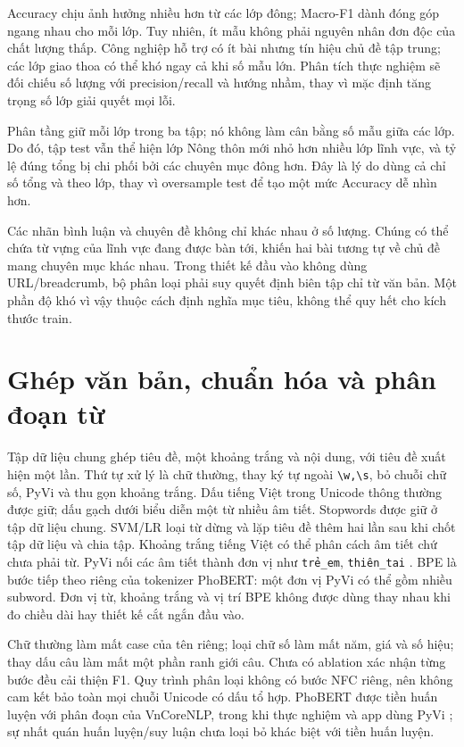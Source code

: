 Accuracy chịu ảnh hưởng nhiều hơn từ các lớp đông; Macro-F1 dành đóng góp ngang nhau cho mỗi lớp. Tuy nhiên, ít mẫu không phải nguyên nhân đơn độc của chất lượng thấp. Công nghiệp hỗ trợ có ít bài nhưng tín hiệu chủ đề tập trung; các lớp giao thoa có thể khó ngay cả khi số mẫu lớn. Phân tích thực nghiệm sẽ đối chiếu số lượng với precision/recall và hướng nhầm, thay vì mặc định tăng trọng số lớp giải quyết mọi lỗi.


Phân tầng giữ mỗi lớp trong ba tập; nó không làm cân bằng số mẫu giữa các lớp. Do đó, tập test vẫn thể hiện lớp Nông thôn mới nhỏ hơn nhiều lớp lĩnh vực, và tỷ lệ đúng tổng bị chi phối bởi các chuyên mục đông hơn. Đây là lý do dùng cả chỉ số tổng và theo lớp, thay vì oversample test để tạo một mức Accuracy dễ nhìn hơn.

Các nhãn bình luận và chuyên đề không chỉ khác nhau ở số lượng. Chúng có thể chứa từ vựng của lĩnh vực đang được bàn tới, khiến hai bài tương tự về chủ đề mang chuyên mục khác nhau. Trong thiết kế đầu vào không dùng URL/breadcrumb, bộ phân loại phải suy quyết định biên tập chỉ từ văn bản. Một phần độ khó vì vậy thuộc cách định nghĩa mục tiêu, không thể quy hết cho kích thước train.
\FloatBarrier
\section{Ghép văn bản, chuẩn hóa và phân đoạn từ}
Tập dữ liệu chung ghép tiêu đề, một khoảng trắng và nội dung, với tiêu đề xuất hiện một lần. Thứ tự xử lý là chữ thường, thay ký tự ngoài \texttt{\textbackslash w,\textbackslash s}, bỏ chuỗi chữ số, PyVi và thu gọn khoảng trắng. Dấu tiếng Việt trong Unicode thông thường được giữ; dấu gạch dưới biểu diễn một từ nhiều âm tiết. Stopwords được giữ ở tập dữ liệu chung. SVM/LR loại từ dừng và lặp tiêu đề thêm hai lần sau khi chốt tập dữ liệu và chia tập.
\PreprocessDiagram
{}
Khoảng trắng tiếng Việt có thể phân cách âm tiết chứ chưa phải từ. PyVi nối các âm tiết thành đơn vị như \texttt{trẻ\_em}, \texttt{thiên\_tai} \citep{pyvi}. BPE là bước tiếp theo riêng của tokenizer PhoBERT: một đơn vị PyVi có thể gồm nhiều subword. Đơn vị từ, khoảng trắng và vị trí BPE không được dùng thay nhau khi đo chiều dài hay thiết kế cắt ngắn đầu vào.

Chữ thường làm mất case của tên riêng; loại chữ số làm mất năm, giá và số hiệu; thay dấu câu làm mất một phần ranh giới câu. Chưa có ablation xác nhận từng bước đều cải thiện F1. Quy trình phân loại không có bước NFC riêng, nên không cam kết bảo toàn mọi chuỗi Unicode có dấu tổ hợp. PhoBERT được tiền huấn luyện với phân đoạn của VnCoreNLP, trong khi thực nghiệm và app dùng PyVi \citep{phobert,phobertcard,vncorenlp2018}; sự nhất quán huấn luyện/suy luận chưa loại bỏ khác biệt với tiền huấn luyện.

